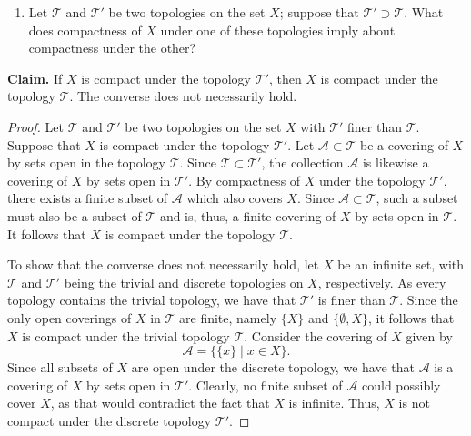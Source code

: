 \begin{solution}
  \begin{enumerate}[label={(\alph*)}, align=left, leftmargin=\parindent, listparindent=\parindent, labelwidth=0pt, itemindent=!]
    \item
          Let $\mathcal{T}$ and $\mathcal{T}'$ be two topologies on the set $X$;
          suppose that $\mathcal{T}' \supset \mathcal{T}$.
          What does compactness of $X$ under one of these topologies imply about compactness under the other?
  \end{enumerate}
  \noindent\textbf{Claim.} If $X$ is compact under the topology $\mathcal{T}'$, then $X$ is compact under the topology $\mathcal{T}$.
  The converse does not necessarily hold.
  \begin{proof}
    Let $\mathcal{T}$ and $\mathcal{T}'$ be two topologies on the set $X$ with $\mathcal{T}'$ finer than $\mathcal{T}$.
    Suppose that $X$ is compact under the topology $\mathcal{T}'$.
    Let $\mathcal{A} \subset \mathcal{T}$ be a covering of $X$ by sets open in the topology $\mathcal{T}$.
    Since $\mathcal{T} \subset \mathcal{T}'$, the collection $\mathcal{A}$ is likewise a covering of $X$ by sets open in $\mathcal{T}'$.
    By compactness of $X$ under the topology $\mathcal{T}'$, there exists a finite subset of $\mathcal{A}$ which also covers $X$.
    Since $\mathcal{A} \subset \mathcal{T}$, such a subset must also be a subset of $\mathcal{T}$ and is, thus, a finite covering of $X$ by sets open in $\mathcal{T}$.
    It follows that $X$ is compact under the topology $\mathcal{T}$.

    To show that the converse does not necessarily hold, let $X$ be an infinite set, with $\mathcal{T}$ and $\mathcal{T}'$ being the trivial and discrete topologies on $X$, respectively.
    As every topology contains the trivial topology, we have that $\mathcal{T}'$ is finer than $\mathcal{T}$.
    Since the only open coverings of $X$ in $\mathcal{T}$ are finite, namely $\{X\}$ and $\{\emptyset, X\}$, it follows that $X$ is compact under the trivial topology $\mathcal{T}$.
    Consider the covering of $X$ given by
    \begin{equation*}
      \mathcal{A} = \{\{x\} \mid x \in X\}.
    \end{equation*}
    Since all subsets of $X$ are open under the discrete topology, we have that $\mathcal{A}$ is a covering of $X$ by sets open in $\mathcal{T}'$.
    Clearly, no finite subset of $\mathcal{A}$ could possibly cover $X$, as that would contradict the fact that $X$ is infinite.
    Thus, $X$ is not compact under the discrete topology $\mathcal{T}'$.
  \end{proof}
  \bigskip


\end{solution}
